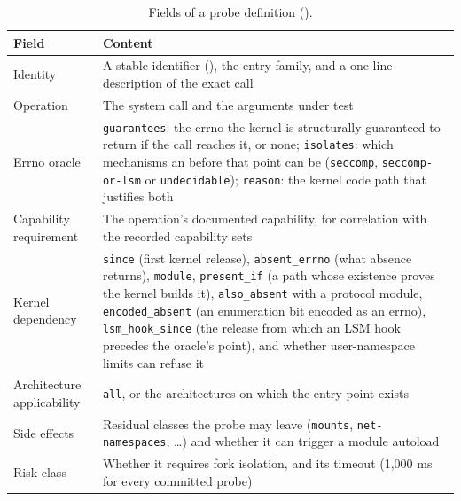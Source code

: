 \begin{table}[htbp]
\centering\small
\begin{tabularx}{\textwidth}{@{}P{3.3cm}L@{}}
\toprule
\textbf{Field} & \textbf{Content} \\
\midrule
Identity & A stable identifier (), the entry family, and a one-line description of the exact call \\
Operation & The system call and the arguments under test \\
Errno oracle & \texttt{guarantees}: the errno the kernel is structurally guaranteed to return if the call reaches it, or none; \texttt{isolates}: which mechanisms an  before that point can be (\texttt{seccomp}, \texttt{seccomp-or-lsm} or \texttt{undecidable}); \texttt{reason}: the kernel code path that justifies both \\
Capability requirement & The operation's documented capability, for correlation with the recorded capability sets \\
Kernel dependency & \texttt{since} (first kernel release), \texttt{absent\_errno} (what absence returns), \texttt{module}, \texttt{present\_if} (a path whose existence proves the kernel builds it), \texttt{also\_absent} with a protocol module, \texttt{encoded\_absent} (an enumeration bit encoded as an errno), \texttt{lsm\_hook\_since} (the release from which an LSM hook precedes the oracle's point), and whether user-namespace limits can refuse it \\
Architecture applicability & \texttt{all}, or the architectures on which the entry point exists \\
Side effects & Residual classes the probe may leave (\texttt{mounts}, \texttt{net-namespaces}, \ldots) and whether it can trigger a module autoload \\
Risk class & Whether it requires fork isolation, and its timeout (1,000 ms for every committed probe) \\
\bottomrule
\end{tabularx}
\caption{Fields of a probe definition ().}
\label{tab:probespec}
\end{table}

